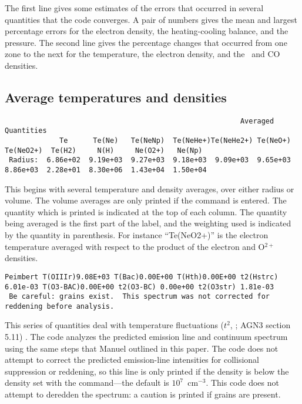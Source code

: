 The first line gives some estimates of the errors that occurred in several
quantities that the code converges.
A pair of numbers gives the mean and
largest percentage errors for the electron density, the heating-cooling
balance, and the pressure.
The second line gives the percentage changes
that occurred from one zone to the next for the temperature, the electron
density, and the \htwo\ and CO densities.

\subsection{Average temperatures and densities}
{\setverbatimfontsize{\tiny}
\begin{verbatim}
                                                        Averaged Quantities
             Te      Te(Ne)   Te(NeNp)  Te(NeHe+)Te(NeHe2+) Te(NeO+)  Te(NeO2+)  Te(H2)     N(H)     Ne(O2+)   Ne(Np)
 Radius:  6.86e+02  9.19e+03  9.27e+03  9.18e+03  9.09e+03  9.65e+03  8.86e+03  2.28e+01  8.30e+06  1.43e+04  1.50e+04
 \end{verbatim}
}

 This begins with several temperature and density averages, over either
radius or volume.
The volume averages are only printed if the
 command
is entered.
The quantity which is printed is indicated at the top of each
column.
The quantity being averaged is the first part of the label, and
the weighting used is indicated by the quantity in parenthesis.
For instance ``Te(NeO2+)'' is the electron temperature averaged
with respect to the product
of the electron and O$^{2+}$ densities.
{\setverbatimfontsize{\tiny}
\begin{verbatim}
Peimbert T(OIIIr)9.08E+03 T(Bac)0.00E+00 T(Hth)0.00E+00 t2(Hstrc) 6.01e-03 T(O3-BAC)0.00E+00 t2(O3-BC) 0.00e+00 t2(O3str) 1.81e-03
 Be careful: grains exist.  This spectrum was not corrected for reddening before analysis.
\end{verbatim}
}

This series of quantities deal with temperature fluctuations ($t^2$, \citealp{Peimbert1967}; AGN3 section 5.11) .
The code analyzes the predicted emission line
and continuum spectrum using the same steps that Manuel outlined in this
paper.
The code does not attempt to correct the predicted emission-line
intensities for collisional suppression or reddening, so this line is only
printed if the density is below the density set with the
 command---the default is $10^7$~cm$^{-3}$.
This code does not attempt to deredden the
spectrum: a caution is printed if grains are present.

